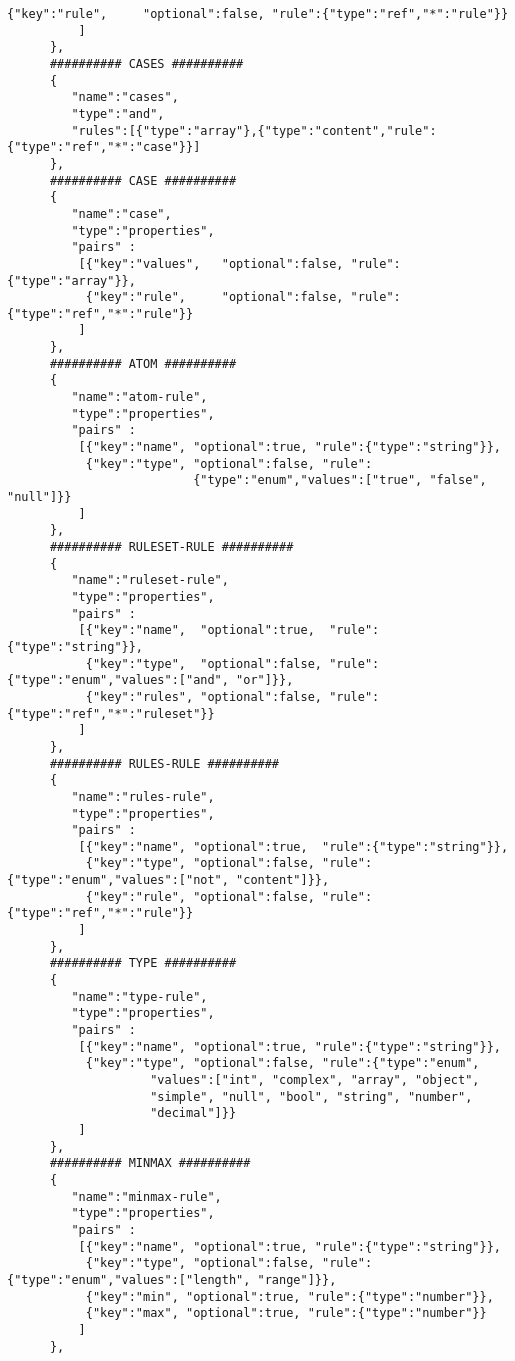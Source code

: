 \documentclass[a4paper]{article}
\begin{document}
\begin{lstlisting}[basicstyle=\ttfamily\scriptsize{}]
           {"key":"rule",     "optional":false, "rule":{"type":"ref","*":"rule"}}
          ]
      },
      ########## CASES ##########
      {
         "name":"cases",
         "type":"and",
         "rules":[{"type":"array"},{"type":"content","rule":{"type":"ref","*":"case"}}]
      },
      ########## CASE ##########
      {
         "name":"case",
         "type":"properties",
         "pairs" :
          [{"key":"values",   "optional":false, "rule":{"type":"array"}},
           {"key":"rule",     "optional":false, "rule":{"type":"ref","*":"rule"}}
          ]
      },
      ########## ATOM ##########
      {
         "name":"atom-rule",
         "type":"properties",
         "pairs" :
          [{"key":"name", "optional":true, "rule":{"type":"string"}},
           {"key":"type", "optional":false, "rule":
                          {"type":"enum","values":["true", "false", "null"]}}
          ]
      },
      ########## RULESET-RULE ##########
      {
         "name":"ruleset-rule",
         "type":"properties",
         "pairs" :
          [{"key":"name",  "optional":true,  "rule":{"type":"string"}},
           {"key":"type",  "optional":false, "rule":{"type":"enum","values":["and", "or"]}},
           {"key":"rules", "optional":false, "rule":{"type":"ref","*":"ruleset"}}
          ]
      },
      ########## RULES-RULE ##########
      {
         "name":"rules-rule",
         "type":"properties",
         "pairs" :
          [{"key":"name", "optional":true,  "rule":{"type":"string"}},
           {"key":"type", "optional":false, "rule":{"type":"enum","values":["not", "content"]}},
           {"key":"rule", "optional":false, "rule":{"type":"ref","*":"rule"}}
          ]
      },
      ########## TYPE ##########
      {
         "name":"type-rule",
         "type":"properties",
         "pairs" :
          [{"key":"name", "optional":true, "rule":{"type":"string"}},
           {"key":"type", "optional":false, "rule":{"type":"enum",
                    "values":["int", "complex", "array", "object", 
                    "simple", "null", "bool", "string", "number", 
                    "decimal"]}}
          ]
      },
      ########## MINMAX ##########
      {
         "name":"minmax-rule",
         "type":"properties",
         "pairs" :
          [{"key":"name", "optional":true, "rule":{"type":"string"}},
           {"key":"type", "optional":false, "rule":{"type":"enum","values":["length", "range"]}},
           {"key":"min", "optional":true, "rule":{"type":"number"}},
           {"key":"max", "optional":true, "rule":{"type":"number"}}
          ]
      },

\end{lstlisting}
\end{document}
